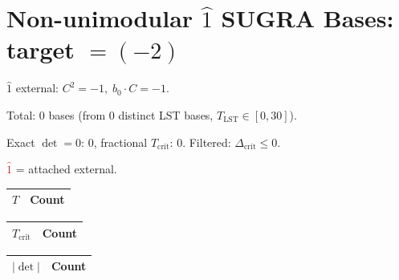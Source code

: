\documentclass[10pt]{article}
\begin{document}
\section*{Non-unimodular $\hat{1}$ SUGRA Bases: target $= (-2)$}

$\hat{1}$ external: $C^2=-1,\; b_0\cdot C=-1$.

Total: 0 bases (from 0 distinct LST bases, $T_{\text{LST}} \in [0, 30]$).

Exact $\det=0$: 0, fractional $T_{\text{crit}}$: 0. Filtered: $\Delta_{\text{crit}} \leq 0$.

\textcolor{red}{$\hat{1}$} = attached external.

\begin{center}
\begin{tabular}{c|c}
\toprule
$T$ & Count \\
\midrule
\bottomrule
\end{tabular}
\qquad\qquad
\begin{tabular}{c|c}
\toprule
$T_{\text{crit}}$ & Count \\
\midrule
\bottomrule
\end{tabular}
\end{center}

\begin{center}
\begin{tabular}{c|c}
\toprule
$|\det|$ & Count \\
\midrule
\bottomrule
\end{tabular}
\end{center}

\newpage
\end{document}
